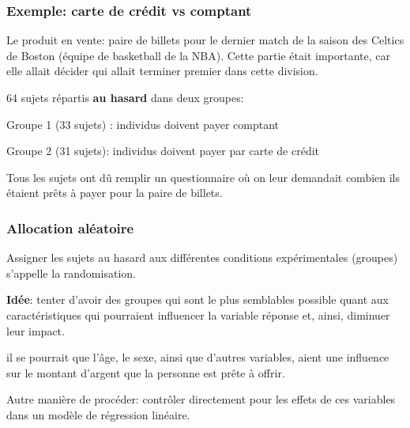 \documentclass[xcolor={dvipsnames}]{beamer}
\begin{document}
\begin{frame}
\frametitle{Exemple: carte de crédit vs comptant}
\bi
\item Le produit en vente: paire de billets pour le dernier match de la saison des Celtics de Boston (équipe de basketball de la NBA). Cette partie était importante, car elle allait décider qui allait terminer premier dans cette division.
\item 64 sujets répartis \textbf{au hasard} dans deux groupes:
\bi
 
\item Groupe 1 (33 sujets) : individus doivent payer comptant
\item Groupe 2 (31 sujets): individus doivent payer par carte de crédit
\ei
\item Tous les sujets ont dû remplir un questionnaire où on leur demandait combien ils étaient prêts à payer pour la paire de billets. 
\ei

\end{frame}

\begin{frame}
\frametitle{Allocation aléatoire}
\bi
\item Assigner les sujets au hasard aux différentes conditions expérimentales (groupes) s'appelle la \alert{randomisation}. 
\item \textbf{Idée}: tenter d'avoir des groupes qui sont \alert{le plus semblables possible} quant aux caractéristiques qui pourraient influencer la variable réponse et, ainsi, diminuer leur impact.
    \bi
\item il se pourrait que l'âge, le sexe, ainsi que d'autres variables, aient une influence sur le montant d'argent que la personne est prête à offrir. 
\ei
\item Autre manière de procéder: contrôler directement pour les effets de ces variables dans un modèle de  régression linéaire.
\ei
\end{frame}
\end{document}
